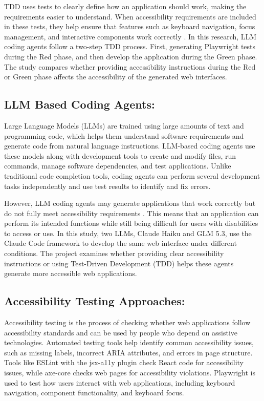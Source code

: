 \documentclass[conference]{IEEEtran}
\begin{document}
TDD uses tests to clearly define how an application should work, making the requirements easier to understand. When accessibility requirements are included in these tests, they help ensure that features such as keyboard navigation, focus management, and interactive components work correctly \cite{fakhoury2024}. In this research, LLM coding agents follow a two-step TDD process. First, generating Playwright tests during the Red phase, and then develop the application during the Green phase. The study compares whether providing accessibility instructions during the Red or Green phase affects the accessibility of the generated web interfaces.

\subsection{LLM Based Coding Agents:}

Large Language Models (LLMs) are trained using large amounts of text and programming code, which helps them understand software requirements and generate code from natural language instructions. LLM-based coding agents use these models along with development tools to create and modify files, run commands, manage software dependencies, and test applications. Unlike traditional code completion tools, coding agents can perform several development tasks independently and use test results to identify and fix errors.

However, LLM coding agents may generate applications that work correctly but do not fully meet accessibility requirements \cite{suh2025}. This means that an application can perform its intended functions while still being difficult for users with disabilities to access or use. In this study, two LLMs, Claude Haiku and GLM 5.3, use the Claude Code framework to develop the same web interface under different conditions. The project examines whether providing clear accessibility instructions or using Test-Driven Development (TDD) helps these agents generate more accessible web applications.

\subsection{Accessibility Testing Approaches:}

Accessibility testing is the process of checking whether web applications follow accessibility standards and can be used by people who depend on assistive technologies. Automated testing tools help identify common accessibility issues, such as missing labels, incorrect ARIA attributes, and errors in page structure. Tools like ESLint with the jsx-a11y plugin \cite{eslintA11y} check React code for accessibility issues, while axe-core \cite{axe2026} checks web pages for accessibility violations. Playwright \cite{playwright2026} is used to test how users interact with web applications, including keyboard navigation, component functionality, and keyboard focus.
\end{document}
